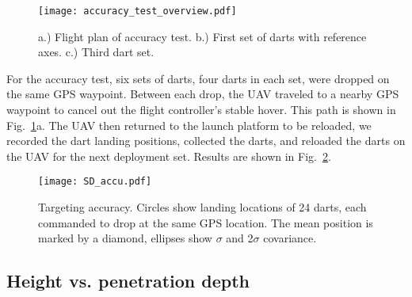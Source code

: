 

\begin{figure} \centering
  {\texttt{[image: accuracy\_test\_overview.pdf]}}
 \caption{a.) Flight plan of accuracy test. b.) First set of darts with reference axes. c.) Third dart set. } 
 \label{fig:Accu_test_darts}
\end{figure}

For the accuracy test, six sets of darts, four darts in each set, were dropped on the same GPS waypoint. Between each drop, the UAV traveled to a nearby GPS waypoint to cancel out the flight controller's stable hover.  This path is shown in Fig.~\ref{fig:Accu_test_darts}a. The UAV then returned to the launch platform to be reloaded, we recorded the dart landing positions, collected the darts, and reloaded the darts on the UAV for the next deployment set.
  Results are shown in Fig.~\ref{fig:SD_accu.pdf}.
  





\begin{figure} \centering
  {\texttt{[image: SD\_accu.pdf]}}
 \caption{Targeting accuracy.  Circles show landing locations of 24 darts, each commanded to drop at the same GPS location. The mean position is marked by a diamond, ellipses show  $\sigma$ and 2$\sigma$ covariance.
 \label{fig:SD_accu.pdf}}
\end{figure}


\subsection{Height vs. penetration depth}

